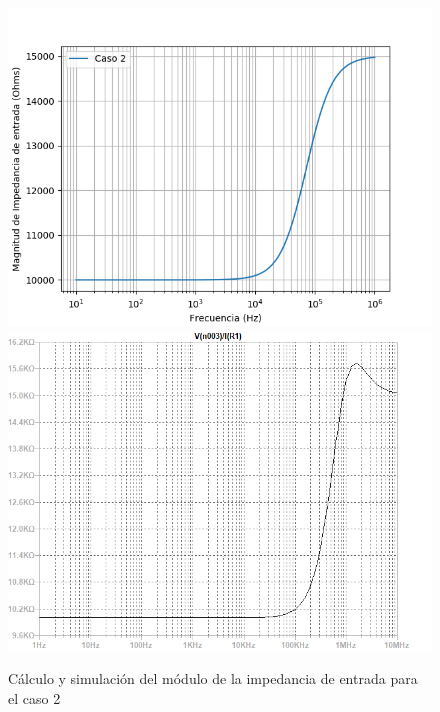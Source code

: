 \begin{figure}[H]
\begin{centering}
\includegraphics[scale=0.5]{../Ex1/iA/Resources1a/zinpm2}\includegraphics[scale=0.4]{../Ex1/iA/Resources1a/zinpm2_sim}
\par\end{centering}
\caption{Cálculo y simulación del módulo de la impedancia de entrada para el
caso 2}
\end{figure}

